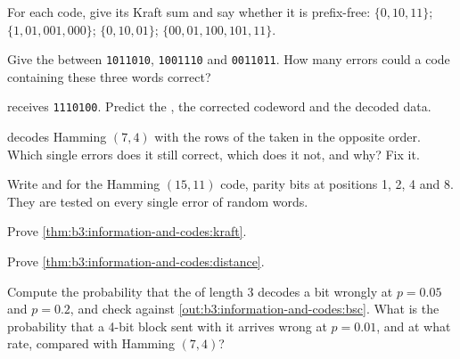 \begin{exercise}[$\star$]\label{exo:b3:information-and-codes:2}
For each code, give its Kraft sum and say whether it is prefix-free: $\{0, 10, 11\}$; $\{1, 01, 001, 000\}$; $\{0, 10, 01\}$; $\{00, 01, 100, 101, 11\}$.
\end{exercise}

\begin{exercise}[$\star$]\label{exo:b3:information-and-codes:3}
Give the  between \texttt{1011010}, \texttt{1001110} and \texttt{0011011}. How many errors could a code containing these three words correct?
\end{exercise}

\begin{exercise}[$\star$]\label{exo:b3:information-and-codes:4}
 receives \texttt{1110100}. Predict the , the corrected codeword and the decoded data.
\end{exercise}

\begin{exercise}[$\star\star$]\label{exo:b3:information-and-codes:5}
 decodes Hamming $(7, 4)$ with the rows of the  taken in the opposite order. Which single errors does it still correct, which does it not, and why? Fix it.
\end{exercise}

\begin{exercise}[$\star\star$]\label{exo:b3:information-and-codes:6}
Write  and  for the Hamming $(15, 11)$ code, parity bits at positions 1, 2, 4 and 8. They are tested on every single error of random words.
\end{exercise}

\begin{exercise}[$\star\star$]\label{exo:b3:information-and-codes:7}
Prove \cref{thm:b3:information-and-codes:kraft}.
\end{exercise}

\begin{exercise}[$\star\star$]\label{exo:b3:information-and-codes:8}
Prove \cref{thm:b3:information-and-codes:distance}.
\end{exercise}

\begin{exercise}[$\star\star$]\label{exo:b3:information-and-codes:9}
Compute the probability that the  of length 3 decodes a bit wrongly at $p = 0.05$ and $p = 0.2$, and check against \cref{out:b3:information-and-codes:bsc}. What is the probability that a 4-bit block sent with it arrives wrong at $p = 0.01$, and at what rate, compared with Hamming $(7, 4)$?
\end{exercise}

